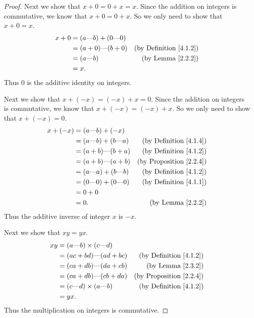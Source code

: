 \begin{proof}
    Next we show that \(x + 0 = 0 + x = x\).
    Since the addition on integers is commutative, we know that \(x + 0 = 0 + x\).
    So we only need to show that \(x + 0 = x\).
    \begin{align*}
        x + 0 & = (a \text{---} b) + (0 \text{---} 0)                                      \\
              & = (a + 0) \text{---} (b + 0)          & \text{(by Definition \ref{4.1.2})} \\
              & = (a \text{---} b)                    & \text{(by Lemma \ref{2.2.2})}      \\
              & = x.
    \end{align*}
    Thus \(0\) is the additive identity on integers.

    Next we show that \(x + (-x) = (-x) + x = 0\).
    Since the addition on integers is commutative, we know that \(x + (-x) = (-x) + x\).
    So we only need to show that \(x + (-x) = 0\).
    \begin{align*}
        x + (-x) & = (a \text{---} b) + (-x)                                                   \\
                 & = (a \text{---} b) + (b \text{---} a) & \text{(by Definition \ref{4.1.4})}  \\
                 & = (a + b) \text{---} (b + a)          & \text{(by Definition \ref{4.1.2})}  \\
                 & = (a + b) \text{---} (a + b)          & \text{(by Proposition \ref{2.2.4})} \\
                 & = (a \text{---} a) + (b \text{---} b) & \text{(by Definition \ref{4.1.2})}  \\
                 & = (0 \text{---} 0) + (0 \text{---} 0) & \text{(by Definition \ref{4.1.1})}  \\
                 & = 0 + 0                                                                     \\
                 & = 0.                                  & \text{(by Lemma \ref{2.2.2})}
    \end{align*}
    Thus the additive inverse of integer \(x\) is \(-x\).

    Next we show that \(xy = yx\).
    \begin{align*}
        xy & = (a \text{---} b) \times (c \text{---} d)                                       \\
           & = (ac + bd) \text{---} (ad + bc)           & \text{(by Definition \ref{4.1.2})}  \\
           & = (ca + db) \text{---} (da + cb)           & \text{(by Lemma \ref{2.3.2})}       \\
           & = (ca + db) \text{---} (cb + da)           & \text{(by Proposition \ref{2.2.4})} \\
           & = (c \text{---} d) \times (a \text{---} b) & \text{(by Definition \ref{4.1.2})}  \\
           & = yx.
    \end{align*}
    Thus the multiplication on integers is commutative.


\end{proof}
